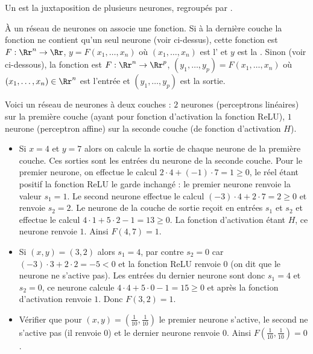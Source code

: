 \documentclass[11pt,class=report,crop=false]{standalone}
\begin{document}
Un  est la juxtaposition de plusieurs neurones, regroupés par . 




\`A un réseau de neurones on associe une fonction.
Si à la dernière couche la fonction ne contient qu'un seul neurone (voir ci-dessus), cette fonction est  
$F : \Rr^n \to \Rr$, $y = F(x_1,\ldots,x_n)$ où $(x_1,\ldots,x_n)$ est l' et $y$ est la .
Sinon (voir ci-dessous), la fonction est  
$F : \Rr^n \to \Rr^p$, $(y_1,\ldots,y_p) = F(x_1,\ldots,x_n)$ où $(x_1,\ldots,x_n) \in \Rr^n$ est l'entrée et $(y_1,\ldots,y_p)$ est la sortie.



\begin{exemple}
Voici un réseau de neurones à deux couches : $2$ neurones (perceptrons linéaires) sur la première couche (ayant pour fonction d'activation la fonction ReLU), $1$ neurone (perceptron affine) sur la seconde couche  (de fonction d'activation $H$).




\begin{itemize}
  \item Si $x=4$ et $y=7$ alors on calcule la sortie de chaque neurone de la première couche. Ces sorties sont les entrées du neurone de la seconde couche.
  Pour le premier neurone, on effectue le calcul $2\cdot4+(-1)\cdot7 = 1 \ge0$, le réel étant positif la fonction ReLU le garde inchangé : le premier neurone renvoie la valeur $s_1=1$. Le second neurone effectue le calcul $(-3)\cdot4+2\cdot7 = 2 \ge0$ et renvoie $s_2=2$.
  Le neurone de la couche de sortie reçoit en entrées $s_1$ et $s_2$ et effectue le calcul $4\cdot 1+5\cdot 2-1 = 13\ge0$. La fonction d'activation étant $H$, ce neurone renvoie $1$.  
  Ainsi $F(4,7)=1$.
  
  
  
  \item Si $(x,y)=(3,2)$ alors $s_1=4$, par contre $s_2=0$ car $(-3)\cdot3+2\cdot2 = -5 <0$ et la fonction ReLU renvoie $0$ (on dit que le neurone ne s'active pas). Les entrées du dernier neurone sont donc $s_1=4$ et $s_2=0$, ce neurone calcule $4\cdot 4 + 5\cdot0-1=15\ge0$ et après la fonction d'activation renvoie $1$. 
  Donc $F(3,2)=1$.
  
  \item Vérifier que pour $(x,y)=(\frac1{10},\frac1{10})$ le premier neurone s'active, le second ne s'active pas (il renvoie $0$) et le dernier neurone renvoie $0$. Ainsi $F(\frac1{10},\frac1{10})=0$.
\end{itemize}
\end{exemple}
\end{document}
